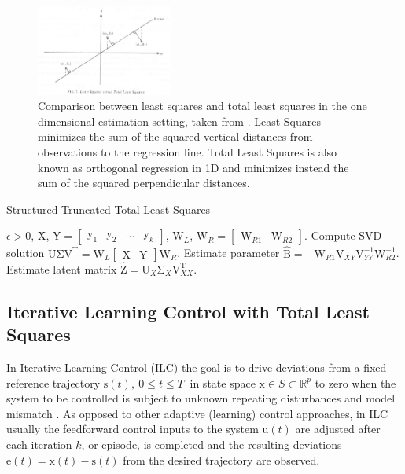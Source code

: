 \documentclass[10pt,a4paper]{article}
\theoremstyle{plain}
\theoremstyle{definition}
\newcommand{\boldvec}[1]{\boldsymbol{\mathrm{#1}}}
\let\vec\boldvec
\newcommand{\state}{\vec{x}} %
\newcommand{\error}{\vec{e}} %
\newcommand{\traj}{\vec{s}} %
\newcommand{\sysInput}{\vec{u}} %
\newcommand{\designMat}{\vec{X}} %
\newcommand{\latentMat}{\vec{Z}} %
\newcommand{\observations}{\vec{y}} %
\newcommand{\fullObs}{\vec{Y}} %
\newcommand{\fullParam}{\vec{B}} %
\newcommand{\weightingMat}{\vec{W}} %
\newcommand{\leftEigenvector}{\vec{U}} %
\newcommand{\rightEigenvector}{\vec{V}} %
\newcommand{\threshold}{\epsilon}
\begin{document}
\begin{figure}
\centering
\includegraphics[width=0.4\textwidth]{LSvsTLS.jpg}%
\caption{Comparison between least squares and total least squares in the one dimensional estimation setting, taken from \cite{Golub80}. Least Squares minimizes the sum of the squared vertical distances from observations to the regression line. Total Least Squares is also known as orthogonal regression in 1D and minimizes instead the sum of the squared perpendicular distances.}
\label{Figure1}
\end{figure}
%

\begin{algorithm}[tb]
   \caption{Structured Truncated Total Least Squares}
   \label{alg1}
\begin{algorithmic}
    $\threshold > 0$, $\designMat$, $\fullObs = \begin{bmatrix} \observations_1 & \observations_2 & \ldots & \observations_k \end{bmatrix}$, $\weightingMat_{L}$, $\weightingMat_{R} = \begin{bmatrix} \weightingMat_{R1} & \weightingMat_{R2}\end{bmatrix}$.
   \STATE Compute SVD solution $\leftEigenvector \vec{\Sigma} \rightEigenvector^{\mathrm{T}} = \weightingMat_{L}\begin{bmatrix} \designMat & \fullObs \end{bmatrix}\weightingMat_{R}$.
   \STATE Estimate parameter $\hat{\fullParam} = -\weightingMat_{R1}\vec{V}_{XY}\vec{V}_{YY}^{-1}\weightingMat_{R2}^{-1}$.
   \STATE Estimate latent matrix $\hat{\latentMat} = \leftEigenvector_{X} \vec{\Sigma}_{X} \rightEigenvector_{XX}^{\mathrm{T}}$.
\end{algorithmic}
\end{algorithm}

%
\subsection{Iterative Learning Control with Total Least Squares}\label{ilcTLS}
%
In Iterative Learning Control (ILC) the goal is to drive deviations from a fixed reference trajectory $\traj(t), \ 0 \leq t \leq T \ $ in state space $\state \in S \subset \mathbb{R}^{p}$ to zero when the system to be controlled is subject to unknown repeating disturbances and model mismatch \cite{Bristow06}. As opposed to other adaptive (learning) control approaches, in ILC usually the feedforward control inputs to the system $\sysInput(t)$ are adjusted after each iteration $k$, or episode, is completed and the resulting deviations $\error(t) = \state(t) - \traj(t)$ from the desired trajectory are observed. %
\end{document}
